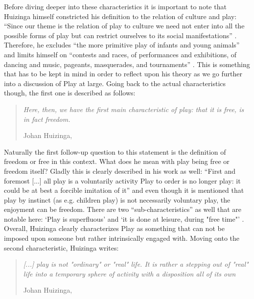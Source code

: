 Before diving deeper into these characteristics it is important to note that Huizinga himself constricted his definition to the relation of culture and play: \enquote{Since our theme is the relation of play to culture we need not enter into all the possible forms of play but can restrict ourselves to its social manifestations} \cite[p. 7]{huizinga2020homo}.
Therefore, he excludes \enquote{the more primitive play of infants and young animals} \cite[p. 7]{huizinga2020homo} and limits himself on \enquote{contests and races, of performances and exhibitions, of dancing and music, pageants, masquerades, and tournaments} \cite[p. 7]{huizinga2020homo}. This is something that has to be kept in mind in order to reflect upon his theory as we go further into a discussion of Play at large. Going back to the actual characteristics though, the first one is described as follows:

\begin{quote}
  \textit{Here, then, we have the first main characteristic of play: that it is free, is in fact freedom.}

  \footnotesize{Johan Huizinga, \cite[p. 8]{huizinga2020homo}}
\end{quote}

Naturally the first follow-up question to this statement is the definition of freedom or free in this context. What does he mean with play being free or freedom itself? Gladly this is clearly described in his work as well: \enquote{First and foremost [...] all play is a voluntarily activity Play to order is no longer play: it could be at best a forcible imitation of it} \cite[p. 7]{huizinga2020homo} and even though it is mentioned that play by instinct (as e.g. children play) is not necessarily voluntary play, the enjoyment can be freedom. There are two \enquote{sub-characteristics} as well that are notable here: \enquote*{Play is superfluous} and \enquote*{it is done at leisure, during "free time"} \cite[p. 8]{huizinga2020homo}. Overall, Huizinga clearly characterizes Play as something that can not be imposed upon someone but rather intrinsically engaged with.
Moving onto the second characteristic, Huizinga writes:

\begin{quote}
  \textit{[...] play is not "ordinary" or "real" life. It is rather a stepping out of "real" life into a temporary sphere of activity with a disposition all of its own}

  \footnotesize{Johan Huizinga, \cite[p. 8]{huizinga2020homo}}
\end{quote}

